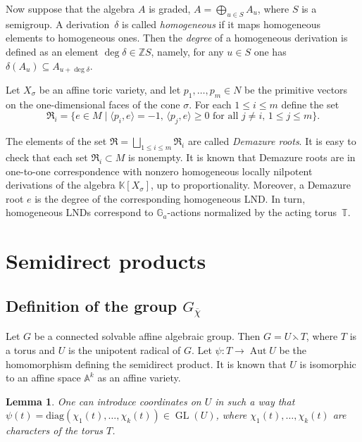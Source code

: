 \documentclass[a4paper, 11pt]{amsart}
\theoremstyle{plain}
\newtheorem{lemma}[theorem]{Lemma}
\theoremstyle{remark}
\theoremstyle{definition}
\renewcommand{\AA}{\mathbb{A}}
\newcommand{\ZZ}{\mathbb{Z}}
\newcommand{\KK}{\mathbb{K}}
\newcommand{\G}{\mathbb{G}}
\newcommand{\GG}{G_{\overline{\chi}}}
\newcommand{\TT}{\mathbb{T}}
\DeclareMathOperator{\GL}{GL}
\DeclareMathOperator{\Aut}{Aut}
\begin{document}
Now suppose that the algebra $A$ is graded, $A = \bigoplus_{u \in S} A_u$, where $S$ is a semigroup. A derivation~$\delta$ is called \textit{homogeneous} if it maps homogeneous elements to homogeneous ones. Then the \textit{degree} of a homogeneous derivation is defined as an element $\deg \delta \in \ZZ S$, namely, for any $u \in S$ one has $\delta(A_u) \subseteq A_{u + \deg \delta}$.

Let $X_\sigma$ be an affine toric variety, and let $p_1, \ldots, p_m \in N$ be the primitive vectors on the one-dimensional faces of the cone $\sigma$. For each $1 \leq i \leq m$ define the set
\begin{equation*}
	\mathfrak{R}_i  = \{ e \in M \mid \langle p_i, e \rangle = -1 , \, \langle p_j, e \rangle \geq 0 \text{ for all } j \neq i,\, 1 \leq j \leq m \}.
\end{equation*}

The elements of the set $\mathfrak{R} = \bigsqcup_{1 \leq i \leq m} \mathfrak{R}_i$ are called \textit{Demazure roots}. It is easy to check that each set $\mathfrak{R}_i \subset M$ is nonempty. It is known that Demazure roots are in one-to-one correspondence with nonzero homogeneous locally nilpotent derivations of the algebra $\KK[X_\sigma]$, up to proportionality. Moreover, a Demazure root $e$ is the degree of the corresponding homogeneous LND. In turn, homogeneous LNDs correspond to $\G_a$-actions normalized by the acting torus~$\TT$.

\section{Semidirect products}\label{aff} 

\subsection{Definition of the group $\GG$}

Let $G$ be a connected solvable affine algebraic group. Then $G = U \leftthreetimes T$, where $T$ is a torus and $U$ is the unipotent radical of $G$. Let $\psi\colon T \rightarrow \Aut U$ be the homomorphism defining the semidirect product. It is known that $U$ is isomorphic to an affine space $\AA^k$ as an affine variety.

\begin{lemma}\cite[Lemma 2]{YZ}\label{lmYZ} One can introduce coordinates on $U$ in such a way that $\psi(t) = \mathrm{diag}(\chi_1(t), \ldots, \chi_k(t)) \in \GL(U)$, where $\chi_1(t), \ldots, \chi_k(t)$ are characters of the torus $T$. 
\end{lemma}
\end{document}
